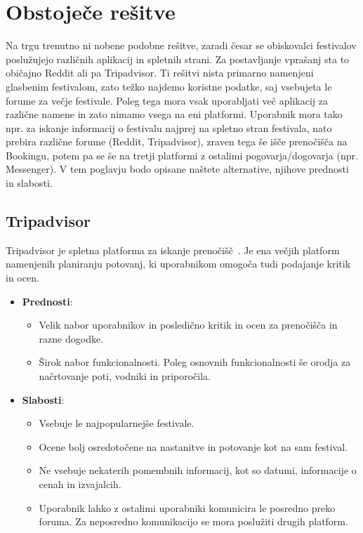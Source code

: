 \documentclass[a4paper,12pt,openright]{book}
\begin{document}
\chapter{Obstoječe rešitve}
Na trgu trenutno ni nobene podobne rešitve, zaradi česar se obiskovalci festivalov poslužujejo različnih aplikacij in spletnih strani. 
Za postavljanje vprašanj sta to običajno Reddit ali pa Tripadvisor. Ti rešitvi nista primarno namenjeni glasbenim festivalom, 
zato težko najdemo koristne podatke, saj vsebujeta le forume za večje festivale.
Poleg tega mora vsak uporabljati več aplikacij za različne namene in zato nimamo vsega na eni platformi. Uporabnik mora tako npr. za iskanje informacij o festivalu najprej na spletno stran festivala,
nato prebira različne forume (Reddit, Tripadvisor), zraven tega še išče prenočišča na Bookingu, potem pa se še na tretji platformi z ostalimi pogovarja/dogovarja (npr. Messenger).
V tem poglavju bodo opisane naštete alternative, njihove prednosti in slabosti.

\section{Tripadvisor}
Tripadvisor je spletna platforma za iskanje prenočišč~\cite{tripadvisor}. Je ena večjih platform namenjenih planiranju potovanj, ki uporabnikom omogoča tudi podajanje kritik in ocen.

\begin{itemize}
    \item \textbf{Prednosti}:
        \begin{itemize}
            \item Velik nabor uporabnikov in posledično kritik in ocen za prenočišča in razne dogodke.
            \item Širok nabor funkcionalnosti. Poleg osnovnih funkcionalnosti še orodja za načrtovanje poti, vodniki in priporočila.
        \end{itemize}
    \item \textbf{Slabosti}:
        \begin{itemize}
            \item Vsebuje le najpopularnejše festivale.
            \item Ocene bolj osredotočene na nastanitve in potovanje kot na sam festival.
            \item Ne vsebuje nekaterih pomembnih informacij, kot so datumi, informacije o cenah in izvajalcih.
            \item Uporabnik lahko z ostalimi uporabniki komunicira le posredno preko foruma. Za neposredno komunikacijo se mora poslužiti drugih platform.
        \end{itemize}
\end{itemize}
\end{document}

